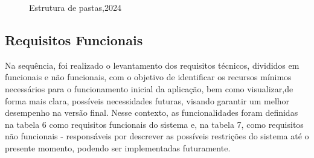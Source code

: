 \begin{figure} [h!]
	\caption{Estrutura de pastas,2024}
	\label{fig:EstruturaDePastas}
\end{figure}


\subsection{Requisitos Funcionais}

Na sequência, foi realizado o levantamento dos requisitos técnicos, divididos em funcionais e não funcionais, com o objetivo de identificar os recursos mínimos necessários para o funcionamento inicial da aplicação, bem como visualizar,de forma mais clara, possíveis necessidades futuras, visando garantir um melhor desempenho na versão final. Nesse contexto, as funcionalidades foram definidas na tabela 6 como requisitos funcionais do sistema e, na tabela 7, como requisitos não funcionais - responsáveis por descrever as possíveis restrições do sistema até o presente momento, podendo ser implementadas futuramente.


